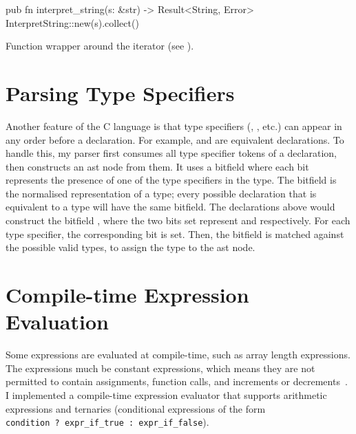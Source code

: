 \documentclass[../00-main.tex]{subfiles}
\begin{document}
\begin{listing}[!t]
  \begin{RustListing}
    pub fn interpret_string(s: &str) -> Result<String, Error> {
        InterpretString::new(s).collect()
    }
  \end{RustListing}
  \caption{Function wrapper around the  iterator (see ).}
  \label{app:lst:interpret string function}
\end{listing}


\section{Parsing Type Specifiers}\label{app:sec:parsing type specifiers}

Another feature of the C language is that type specifiers (, , etc.) can appear in any order before a declaration.
For example,  and  are equivalent declarations.
To handle this, my parser first consumes all type specifier tokens of a declaration, then constructs an  \gls{ast} node from them.
It uses a bitfield where each bit represents the presence of one of the type specifiers in the type.
The bitfield is the normalised representation of a type; every possible declaration that is equivalent to a type will have the same bitfield.
The declarations above would construct the bitfield , where the two bits set represent  and  respectively.
For each type specifier, the corresponding bit is set.
Then, the bitfield is matched against the possible valid types, to assign the type to the \gls{ast} node.


\section{Compile-time Expression Evaluation}\label{app:sec:compile time expression evaluation}

Some expressions are evaluated at compile-time, such as array length expressions.
The expressions much be constant expressions, which means they are not permitted to contain assignments, function calls, and increments or decrements~.
I implemented a compile-time expression evaluator that supports arithmetic expressions and ternaries (conditional expressions of the form \texttt{condition~?~expr_if_true~:~expr_if_false}).
\end{document}

